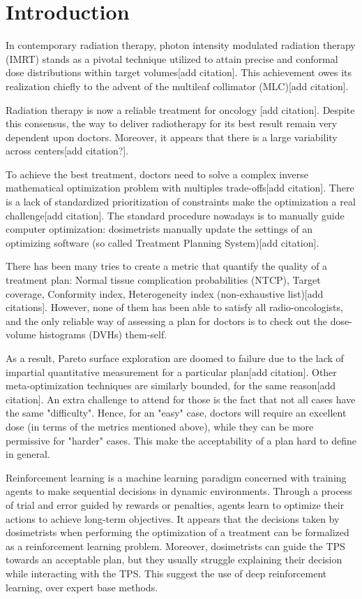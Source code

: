 \section{Introduction}
In contemporary radiation therapy, photon intensity modulated radiation therapy (IMRT) stands as a pivotal technique utilized to attain precise and conformal dose distributions within target volumes[add citation].
This achievement owes its realization chiefly to the advent of the multileaf collimator (MLC)[add citation].

Radiation therapy is now a reliable treatment for oncology [add citation].
Despite this consensus, the way to deliver radiotherapy for its best result remain very dependent upon doctors.
Moreover, it appears that there is a large variability across centers[add citation?].

To achieve the best treatment, doctors need to solve a complex inverse mathematical optimization problem with multiples trade-offs[add citation].
There is a lack of standardized prioritization of constraints make the optimization a real challenge[add citation].
The standard procedure nowadays is to manually guide computer optimization: dosimetrists manually update the settings of an optimizing software (so called Treatment Planning System)[add citation].

There has been many tries to create a metric that quantify the quality of a treatment plan: Normal tissue complication probabilities (NTCP), Target coverage, Conformity index, Heterogeneity index (non-exhaustive list)[add citations].\label{metrics}
However, none of them has been able to satisfy all radio-oncologists, and the only reliable way of assessing a plan for doctors is to check out the dose-volume histograms (DVHs) them-self.

As a result, Pareto surface exploration are doomed to failure due to the lack of impartial quantitative measurement for a particular plan[add citation].
Other meta-optimization techniques are similarly bounded, for the same reason[add citation].
An extra challenge to attend for those is the fact that not all cases have the same "difficulty".
Hence, for an "easy" case, doctors will require an excellent dose (in terms of the metrics mentioned above), while they can be more permissive for "harder" cases.
This make the acceptability of a plan hard to define in general.

Reinforcement learning is a machine learning paradigm concerned with training agents to make sequential decisions in dynamic environments.
Through a process of trial and error guided by rewards or penalties, agents learn to optimize their actions to achieve long-term objectives.
It appears that the decisions taken by dosimetrists when performing the optimization of a treatment can be formalized as a reinforcement learning problem.
Moreover, dosimetrists can guide the TPS towards an acceptable plan, but they usually struggle explaining their decision while interacting with the TPS.
This suggest the use of deep reinforcement learning, over expert base methods.

